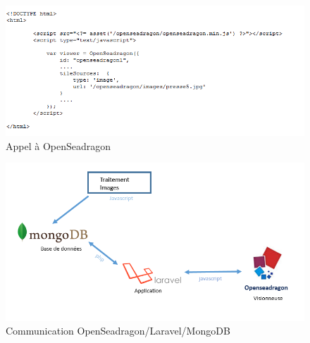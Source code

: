 	  \begin{figure}[H]
        \centering
        \includegraphics[width=\textwidth]{figure/osd.png}
            \caption{Appel à OpenSeadragon}
            \label{seadragon}
    \end{figure}
	
		  \begin{figure}[H]
        \centering
        \includegraphics[width=\textwidth]{figure/osdarchi.png}
            \caption{Communication OpenSeadragon/Laravel/MongoDB}
            \label{seadragonarchi}
    \end{figure}




